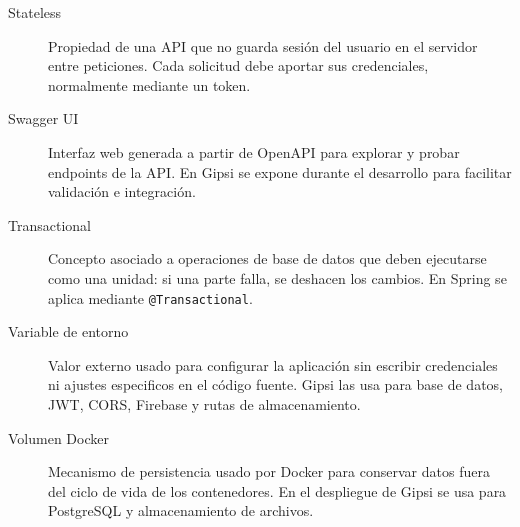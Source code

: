 \documentclass[12pt,a4paper,twoside]{report}
\begin{document}
\begin{description}
  \item[Stateless]
  Propiedad de una API que no guarda sesi\'on del usuario en el servidor entre peticiones.
  Cada solicitud debe aportar sus credenciales, normalmente mediante un token.

  \item[Swagger UI]
  Interfaz web generada a partir de OpenAPI para explorar y probar endpoints de la API.
  En Gipsi se expone durante el desarrollo para facilitar validaci\'on e integraci\'on.

  \item[Transactional]
  Concepto asociado a operaciones de base de datos que deben ejecutarse como una unidad:
  si una parte falla, se deshacen los cambios. En Spring se aplica mediante
  \texttt{@Transactional}.

  \item[Variable de entorno]
  Valor externo usado para configurar la aplicaci\'on sin escribir credenciales ni ajustes
  especificos en el c\'odigo fuente. Gipsi las usa para base de datos, JWT, CORS, Firebase
  y rutas de almacenamiento.

  \item[Volumen Docker]
  Mecanismo de persistencia usado por Docker para conservar datos fuera del ciclo de vida
  de los contenedores. En el despliegue de Gipsi se usa para PostgreSQL y almacenamiento
  de archivos.

\end{description}
\end{document}
